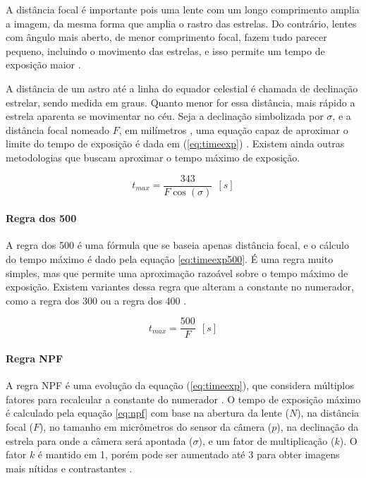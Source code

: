 A distância focal é importante pois uma lente com um longo comprimento amplia a imagem, da mesma forma que amplia o rastro das estrelas. Do contrário, lentes com ângulo mais aberto, de menor comprimento focal, fazem tudo parecer pequeno, incluindo o movimento das estrelas, e isso permite um tempo de exposição maior \cite{book:astrophotographyAmateur}.

A distância de um astro até a linha do equador celestial é chamada de declinação estrelar, sendo medida em graus. Quanto menor for essa distância, mais rápido a estrela aparenta se movimentar no céu. Seja a declinação simbolizada por $\sigma$, e a distância focal nomeado $F$, em milímetros , uma equação capaz de aproximar o limite do tempo de exposição é dada em (\ref{eq:timeexp}) \cite{book:astrophotographyAmateur}. Existem ainda outras metodologias que buscam aproximar o tempo máximo de exposição. 

\begin{equation}
	t_{max} = \dfrac{343}{F\cos(\sigma)}~~[s]
	\label{eq:timeexp}
\end{equation}



\paragraph{Regra dos 500}

A regra dos 500 é uma fórmula que se baseia apenas distância focal, e o cálculo do tempo máximo é dado pela equação \ref{eq:timeexp500}. É uma regra muito simples, mas que permite uma aproximação razoável sobre o tempo máximo de exposição. Existem variantes dessa regra que alteram a constante no numerador, como a regra dos 300 ou a regra dos 400 \cite{site:500xNPF}.

\begin{equation}
	t_{max} = \dfrac{500}{F}~~[s]
	\label{eq:timeexp500}
\end{equation}

\paragraph{Regra NPF}

A regra NPF é uma evolução da equação (\ref{eq:timeexp}), que considera múltiplos fatores para recalcular a constante do numerador
\cite{site:500xNPF}. O tempo de exposição máximo é calculado pela equação \ref{eq:npf} com base na abertura da lente ($ N $), na distância focal ($ F $), no tamanho em micrômetros do sensor da câmera ($ p $), na declinação da estrela para onde a câmera será apontada ($\sigma$), e um fator de multiplicação ($ k $). O fator $ k $ é mantido em 1, porém pode ser aumentado até 3 para obter imagens mais nítidas e contrastantes \cite{site:500xNPF}. 


